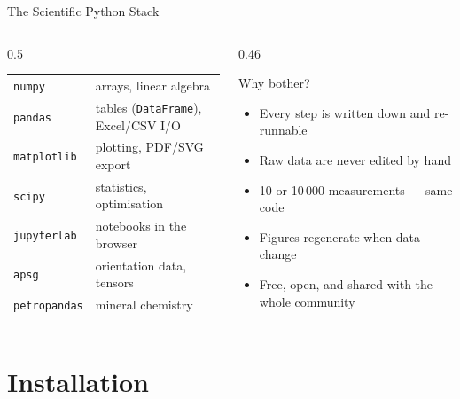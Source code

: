 \documentclass[aspectratio=169,11pt]{beamer}
\begin{document}
\begin{frame}{The Scientific Python Stack}
  \begin{columns}[T]
    \begin{column}{0.5\textwidth}
      \footnotesize
      \begin{tabularx}{\textwidth}{lX}
        \toprule
        \texttt{numpy} & arrays, linear algebra \\
        \texttt{pandas} & tables (\texttt{DataFrame}), Excel/CSV I/O \\
        \texttt{matplotlib} & plotting, PDF/SVG export \\
        \texttt{scipy} & statistics, optimisation \\
        \texttt{jupyterlab} & notebooks in the browser \\
        \midrule
        \texttt{apsg} & orientation data, tensors \\
        \texttt{petropandas} & mineral chemistry \\
        \bottomrule
      \end{tabularx}
    \end{column}
    \begin{column}{0.46\textwidth}
      \begin{block}{Why bother?}
        \small
        \begin{itemize}
          \item Every step is written down and re-runnable
          \item Raw data are never edited by hand
          \item 10 or 10\,000 measurements --- same code
          \item Figures regenerate when data change
          \item Free, open, and shared with the whole community
        \end{itemize}
      \end{block}
    \end{column}
  \end{columns}
\end{frame}

\section{Installation}
\end{document}
